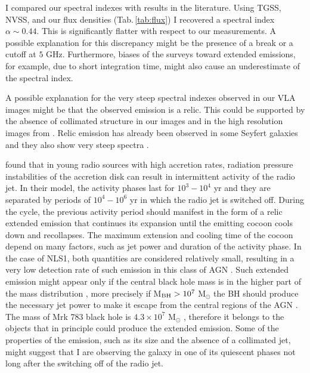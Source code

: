 \documentclass[../main.tex]{subfiles}
\begin{document}
I compared our spectral indexes with results in the literature.
Using TGSS, NVSS, and our flux densities (Tab.\,\ref{tab:flux}) I recovered a spectral index $\alpha\sim 0.44$.
This is significantly flatter with respect to our measurements.
A possible explanation for this discrepancy might be the presence of a break or a cutoff at $5$ GHz.
Furthermore, biases of the surveys toward extended emissions, for example, due to short integration time, might also cause an underestimate of the spectral index.

A possible explanation for the very steep spectral indexes observed in our VLA images might be that the observed emission is a relic.
This could be supported by the absence of collimated structure in our images and in the high resolution images from \citet{Doi13}.
Relic emission has already been observed in some Seyfert galaxies \citep[e.g., NGC 4235,][]{Kharb16} and they also show very steep spectra \citep[e.g.,][]{Jamrozy04,Kharb16}.

\citet{Czerny09} found that in young radio sources with high accretion rates, radiation pressure instabilities of the accretion disk can result in intermittent activity of the radio jet.
In their model, the activity phases last for $10^3-10^4$ yr and they are separated by periods of $10^4-10^6$ yr in which the radio jet is switched off.
During the cycle, the previous activity period should manifest in the form of a relic extended emission that continues its expansion until the emitting cocoon cools down and recollapses.
The maximum extension and cooling time of the cocoon depend on many factors, such as jet power and duration of the activity phase.
In the case of NLS1, both quantities are considered relatively small, resulting in a very low detection rate of such emission in this class of AGN \citep{Czerny09,Foschini15}. 
Such extended emission might appear only if the central black hole mass is in the higher part of the mass distribution \citep[which spans between $10^6$ to $10^8$ M$_{\odot}$, e.g.,][]{Cracco16}, more precisely if M$_{\rm BH}>10^7$ M$_{\odot}$ the BH should produce the necessary jet power to make it escape from the central regions of the AGN \citep{Doi12}.
The mass of Mrk 783 black hole is $4.3\times10^7$ M$_{\odot}$ \citep{Berton15a}, therefore it belongs to the objects that in principle could produce the extended emission.
Some of the properties of the emission, such as its size and the absence of a collimated jet, might suggest that I are observing the galaxy in one of its quiescent phases not long after the switching off of the radio jet.
\end{document}
